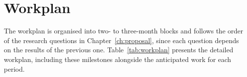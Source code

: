 \chapter{Workplan}
\label{ch:workplan}

The workplan is organised into two- to three-month blocks and follows the order of the research questions in Chapter~\ref{ch:proposal}, since each question depends on the results of the previous one.
Table~\ref{tab:workplan} presents the detailed workplan, including these milestones alongside the anticipated work for each period.

\newcommand{\wpmilestone}{\rowcolor{ThesisPurple!8}}
\newcommand{\wprqone}[1]{\textcolor{ThesisGreen}{\textbf{#1}}}
\newcommand{\wprqtwo}[1]{\textcolor{ThesisOrange}{\textbf{#1}}}
\newcommand{\wprqthree}[1]{\textcolor{ThesisBlue}{\textbf{#1}}}
\newcommand{\wpyear}[1]{\multicolumn{2}{l}{\textbf{#1}} \\ \midrule}

